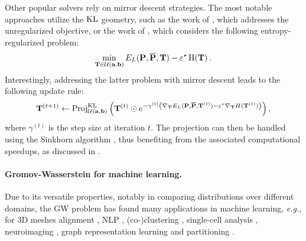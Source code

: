 Other popular solvers rely on mirror descent strategies. The most notable approaches utilize the $\operatorname{KL}$ geometry, such as the work of \cite{xu2019gromov}, which addresses the unregularized  objective, or the work of \cite{peyre2016gromov}, which considers the following entropy-regularized problem:
\begin{align}
    \min_{{\mathbf{T}} \in {\mathcal{U}}({\mathbf{a}}, {\mathbf{b}})} E_L({\mathbf{P}}, \overline{{\mathbf{P}}}, {\mathbf{T}}) - \varepsilon^\star \operatorname{H}({\mathbf{T}}) \:.
\end{align}
Interestingly, addressing the latter problem with mirror descent leads to the following update rule:
\begin{align}
    {\mathbf{T}}^{(t+1)} \leftarrow \text{Proj}^{\operatorname{KL}}_{{\mathcal{U}}({\mathbf{a}}, {\mathbf{b}})} \left( {\mathbf{T}}^{(t)} \odot e^{-\gamma^{(t)} \left( \nabla_{{\mathbf{T}}} E_L({\mathbf{P}}, \overline{{\mathbf{P}}}, {\mathbf{T}}^{(t)}) - \varepsilon^\star \nabla_{{\mathbf{T}}} H({\mathbf{T}}^{(t)}) \right)} \right),
\end{align}
where $\gamma^{(t)}$ is the step size at iteration $t$. The projection can then be handled using the Sinkhorn algorithm \citep{cuturi2013sinkhorn}, thus benefiting from the associated computational speedups, as discussed in .


\paragraph{Gromov-Wasserstein for machine learning.}
Due to its versatile properties, notably in comparing distributions over different domains,  the GW problem has found many applications in machine learning, \textit{e.g.,} for 3D meshes alignment \citep{solomon2016entropic,ezuz2017gwcnn}, NLP \citep{alvarez2018gromov}, (co-)clustering  \citep{peyre2016gromov, redko2020co}, single-cell analysis \citep{demetci2020gromov}, neuroimaging \citep{thual2022aligning}, graph representation learning \citep{xu2020gromov, vincent2021online, liu2022robust, vincent2022template, pmlr-v202-zeng23c} and partitioning \citep{xu2019scalable, chowdhury2021generalized}.
